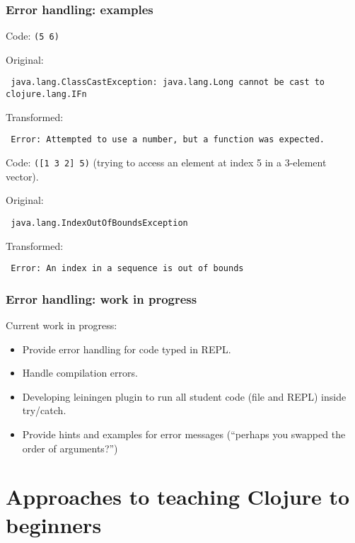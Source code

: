 \documentclass{beamer}
\begin{document}
\begin{frame}
\frametitle{Error handling: examples}
Code: {\tt (5 6)} 

Original:

{\tt
java.lang.ClassCastException: java.lang.Long cannot be cast to clojure.lang.IFn
}

Transformed:

{\tt
Error: Attempted to use a number, but a function was expected.
}

Code: {\tt ([1 3 2] 5)} (trying to access an element at index 5 in a 3-element vector).

Original:

{\tt
java.lang.IndexOutOfBoundsException
}

Transformed:

{\tt
Error: An index in a sequence is out of bounds
}
\end{frame}

\begin{frame}
\frametitle{Error handling: work in progress}
Current work in progress:
\begin{itemize}
\item Provide error handling for code typed in REPL.
\item Handle compilation errors. 
\item Developing leiningen plugin to run all student code (file and REPL) inside try/catch. 
\item Provide hints and examples for error messages (``perhaps you swapped the order of arguments?'')
\end{itemize}
\end{frame}

\section{Approaches to teaching Clojure to beginners}
\end{document}
